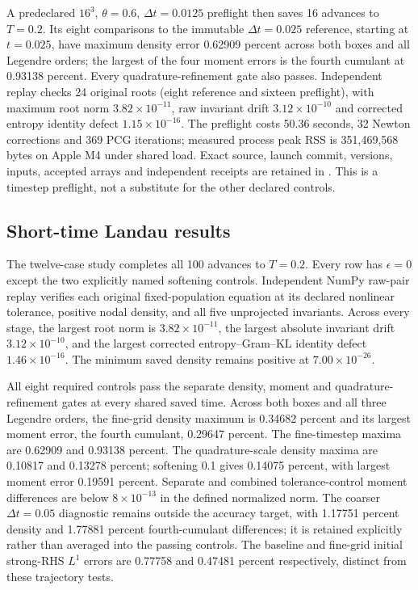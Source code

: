 \documentclass[11pt,letterpaper]{article}
\begin{document}
A predeclared $16^3$, $\theta=0.6$, $\Delta t=0.0125$ preflight then saves
16 advances to $T=0.2$. Its eight comparisons to the immutable
$\Delta t=0.025$ reference, starting at $t=0.025$, have maximum density
error 0.62909 percent across both boxes and all Legendre orders; the
largest of the four moment errors is the fourth cumulant at 0.93138
percent. Every quadrature-refinement gate also passes. Independent replay
checks 24 original roots (eight reference and sixteen preflight), with
maximum root norm $3.82\times10^{-11}$, raw invariant drift
$3.12\times10^{-10}$ and corrected entropy identity defect
$1.15\times10^{-16}$. The preflight costs 50.36 seconds, 32 Newton
corrections and 369 PCG iterations; measured process peak RSS is
351,469,568 bytes on Apple M4 under shared load. Exact source, launch
commit, versions, inputs, accepted arrays and independent receipts are
retained in . This is
a timestep preflight, not a substitute for the other declared controls.


\subsection{Short-time Landau results}
The twelve-case study completes all 100 advances to $T=0.2$.
Every row has $\epsilon=0$ except the two explicitly named softening
controls. Independent NumPy raw-pair replay verifies each original
fixed-population equation at its declared nonlinear tolerance, positive
nodal density, and all five unprojected invariants. Across every stage,
the largest root norm is $3.82\times10^{-11}$, the largest absolute
invariant drift $3.12\times10^{-10}$, and the largest corrected
entropy--Gram--KL identity defect $1.46\times10^{-16}$. The minimum saved
density remains positive at $7.00\times10^{-26}$.

All eight required controls pass the separate density, moment and
quadrature-refinement gates at every shared saved time. Across both
boxes and all three Legendre orders, the fine-grid density maximum is
0.34682 percent and its largest moment error, the fourth cumulant,
0.29647 percent. The fine-timestep maxima are 0.62909 and 0.93138 percent.
The quadrature-scale density maxima are 0.10817 and 0.13278 percent;
softening 0.1 gives 0.14075 percent, with largest moment error 0.19591
percent. Separate and combined tolerance-control moment differences
are below $8\times10^{-13}$ in the defined normalized norm. The coarser
$\Delta t=0.05$ diagnostic remains outside the accuracy target, with
1.17751 percent density and 1.77881 percent fourth-cumulant differences;
it is retained explicitly rather than averaged into the passing controls.
The baseline and fine-grid initial strong-RHS $L^1$ errors are 0.77758
and 0.47481 percent respectively, distinct from these trajectory tests.
\end{document}
